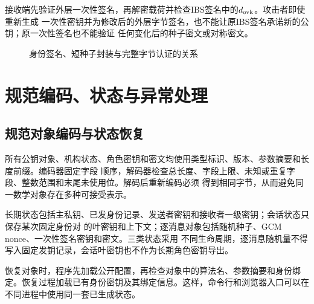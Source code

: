 接收端先验证外层一次性签名，再解密载荷并检查IBS签名中的$d_{\rm ovk}$。攻击者即使重新生成
一次性密钥并为修改后的外层字节签名，也不能让原IBS签名承诺新的公钥；原一次性签名也不能验证
任何变化后的种子密文或对称密文。

\begin{figure}[H]
\centering
{}
\caption{身份签名、短种子封装与完整字节认证的关系}
\label{fig:protocol-generation}
\end{figure}

\section{规范编码、状态与异常处理}

\subsection{规范对象编码与状态恢复}

所有公钥对象、机构状态、角色密钥和密文均使用类型标识、版本、参数摘要和长度前缀。编码器固定字段
顺序，解码器检查总长度、字段上限、未知或重复字段、整数范围和末尾未使用位。解码后重新编码必须
得到相同字节，从而避免同一数学对象存在多种可接受表示。

长期状态包括主私钥、已发身份记录、发送者密钥和接收者一级密钥；会话状态只保存某次固定身份对
的叶密钥和上下文；逐消息对象包括随机种子、GCM nonce、一次性签名密钥和密文。三类状态采用
不同生命周期，逐消息随机量不得写入固定发钥记录，会话叶密钥也不作为长期角色密钥导出。

恢复对象时，程序先加载公开配置，再检查对象中的算法名、参数摘要和身份绑定。恢复过程加载已有身份密钥及其绑定信息。这样，命令行和浏览器入口可以在不同进程中使用同一套已生成状态。

